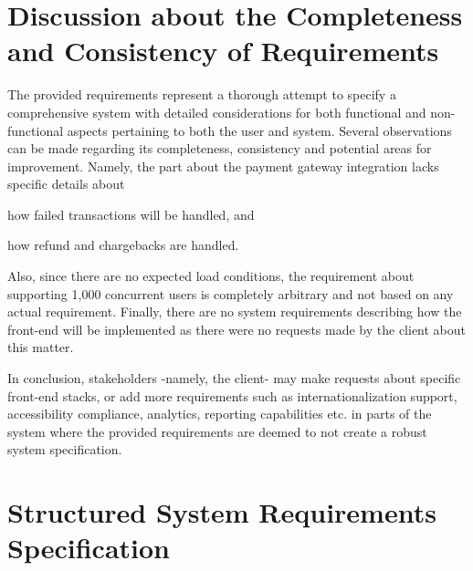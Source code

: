 \documentclass[twoside,a4paper,journal]{IEEEtran}
\begin{document}
\section{Discussion about the Completeness and Consistency of Requirements}
The provided requirements represent a thorough attempt to specify a
comprehensive system with detailed considerations for both functional and
non-functional aspects pertaining to both the user and system.
Several observations can be made regarding its completeness, consistency and
potential areas for improvement. Namely, the part about the payment gateway
integration lacks specific details about
\begin{enumerate*}
  \item how failed transactions will be handled, and
  \item how refund and chargebacks are handled.
\end{enumerate*}
Also, since there are no expected load conditions, the requirement about
supporting 1,000 concurrent users is completely arbitrary and not based on any
actual requirement.
Finally, there are no system requirements describing how the front-end will be
implemented as there were no requests made by the client about this matter.

In conclusion, stakeholders -namely, the client- may make requests about
specific front-end stacks, or add more requirements such as internationalization
support, accessibility compliance, analytics, reporting capabilities etc.
in parts of the system where the provided requirements are deemed to not create
a robust system specification.

\section{Structured System Requirements Specification}
\end{document}
